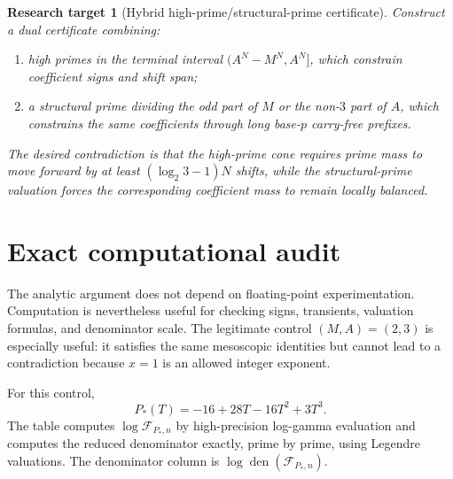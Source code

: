 \documentclass[11pt,oneside]{article}
\newtheorem{target}[theorem]{Research target}
\theoremstyle{definition}
\theoremstyle{remark}
\newcommand{\den}{\operatorname{den}}
\newcommand{\cF}{\mathcal F}
\begin{document}
\begin{target}[Hybrid high-prime/structural-prime certificate]
\label{target:hybrid}
Construct a dual certificate combining:
\begin{enumerate}
\item high primes in the terminal interval $(A^N-M^N,A^N]$, which constrain coefficient
      signs and shift span;
\item a structural prime dividing the odd part of $M$ or the non-$3$ part of $A$, which
      constrains the same coefficients through long base-$p$ carry-free prefixes.
\end{enumerate}
The desired contradiction is that the high-prime cone requires prime mass to move forward by
at least $(\log_2 3-1)N$ shifts, while the structural-prime valuation forces the corresponding
coefficient mass to remain locally balanced.
\end{target}

\section{Exact computational audit}
\label{sec:computation}

The analytic argument does not depend on floating-point experimentation.  Computation is
nevertheless useful for checking signs, transients, valuation formulas, and denominator
scale.  The legitimate control $(M,A)=(2,3)$ is especially useful: it satisfies the same
mesoscopic identities but cannot lead to a contradiction because $x=1$ is an allowed
integer exponent.

For this control,
\begin{equation}
 P_*(T)=-16+28T-16T^2+3T^3.
 \label{eq:Pstar-23}
\end{equation}
The table computes $\log\cF_{P_*,n}$ by high-precision log-gamma evaluation and computes the
reduced denominator exactly, prime by prime, using Legendre valuations.  The denominator
column is $\log\den(\cF_{P_*,n})$.
\end{document}
